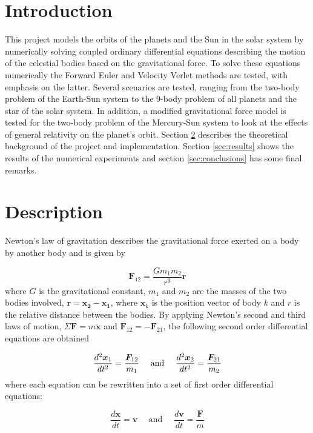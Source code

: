 \documentclass{article}
\begin{document}
\section{Introduction}
This project models the orbits of the planets and the Sun in the solar system by numerically solving coupled ordinary differential equations describing the motion of the celestial bodies based on the gravitational force. To solve these equations numerically the Forward Euler and Velocity Verlet methods are tested, with emphasis on the latter. Several scenarios are tested, ranging from the two-body problem of the Earth-Sun system to the 9-body problem of all planets and the star of the solar system. In addition, a modified gravitational force model is tested for the two-body problem of the Mercury-Sun system to look at the effects of general relativity on the planet's orbit. Section \ref{sec:description} describes the theoretical background of the project and implementation. Section \ref{sec:results} shows the results of the numerical experiments and section \ref{sec:conclusions} has some final remarks.


\section{Description}
\label{sec:description}
Newton's law of gravitation describes the gravitational force exerted on a body by another body and is given by

\begin{equation}
\bm{F}_{12} = \frac{Gm_1m_2}{r^3}\bm{r}
\end{equation}
where $G$ is the gravitational constant, $m_1$ and $m_2$ are the masses of the two bodies involved, $\bm{r} = \bm{x_2} - \bm{x_1}$, where $\bm{x}_k$ is the position vector of body $k$ and $r$ is the relative distance between the bodies. By applying Newton's second and third laws of motion, $\Sigma\bm{F} = m\bm{\ddot x}$ and $\bm{F}_{12}=-\bm{F}_{21}$, the following second order differential equations are obtained

\begin{equation}
\frac{d^2\bm{x}_1}{dt^2} = \frac{\bm{F_}{12}}{m_1} \quad \text{ and } \quad \frac{d^2\bm{x}_2}{dt^2} = \frac{\bm{F}_{21}}{m_2}
\end{equation}
where each equation can be rewritten into a set of first order differential equations:

\begin{equation}
\frac{d\bm{x}}{dt} = \bm{v} \quad \text{ and } \quad \frac{d\bm{v}}{dt} = \frac{\bm{F}}{m}
\end{equation}
\end{document}
